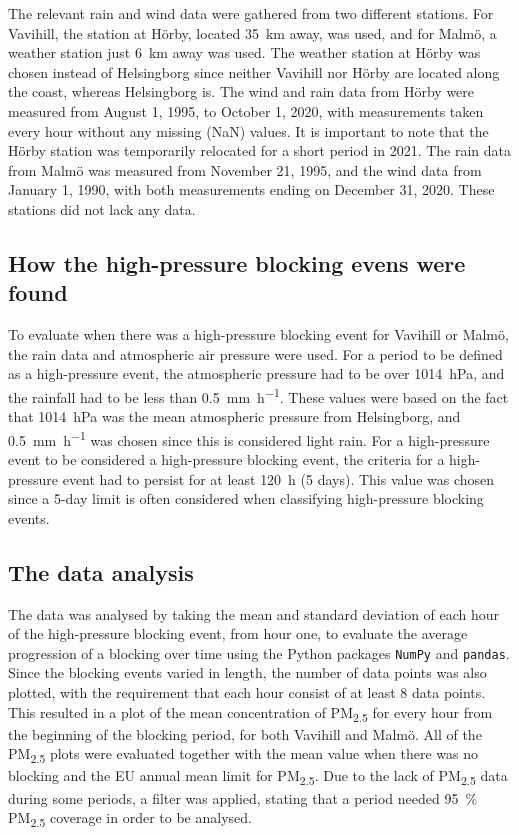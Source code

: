The relevant rain and wind data were gathered from two different stations. For Vavihill, the station at Hörby, located \SI{35}{\km} away, was used, and for Malmö, a weather station just \SI{6}{\km} away was used. The weather station at Hörby was chosen instead of Helsingborg since neither Vavihill nor Hörby are located along the coast, whereas Helsingborg is. The wind and rain data from Hörby were measured from August 1, 1995, to October 1, 2020, with measurements taken every hour without any missing (NaN) values. It is important to note that the Hörby station was temporarily relocated for a short period in 2021. The rain data from Malmö was measured from November 21, 1995, and the wind data from January 1, 1990, with both measurements ending on December 31, 2020. These stations did not lack any data.

\subsection{How the high-pressure blocking evens were found}
To evaluate when there was a high-pressure blocking event for Vavihill or Malmö, the rain data and atmospheric air pressure were used. For a period to be defined as a high-pressure event, the atmospheric pressure had to be over \SI{1014}{\hecto\pascal}, and the rainfall had to be less than \SI{0.5}{\mm\per\hour}. These values were based on the fact that \SI{1014}{\hecto\pascal} was the mean atmospheric pressure from Helsingborg, and \SI{0.5}{\mm\per\hour} was chosen since this is considered light rain. For a high-pressure event to be considered a high-pressure blocking event, the criteria for a high-pressure event had to persist for at least \SI{120}{\hour} (5 days). This value was chosen since a 5-day limit is often considered when classifying high-pressure blocking events. 

\subsection{The data analysis}
The data was analysed by taking the mean and standard deviation of each hour of the high-pressure blocking event, from hour one, to evaluate the average progression of a blocking over time using the Python packages \texttt{NumPy} and \texttt{pandas}. Since the blocking events varied in length, the number of data points was also plotted, with the requirement that each hour consist of at least 8 data points. This resulted in a plot of the mean concentration of PM\textsubscript{2.5} for every hour from the beginning of the blocking period, for both Vavihill and Malmö. All of the PM\textsubscript{2.5} plots were evaluated together with the mean value when there was no blocking and the EU annual mean limit for PM\textsubscript{2.5}. Due to the lack of PM\textsubscript{2.5} data during some periods, a filter was applied, stating that a period needed \SI{95}{\%} PM\textsubscript{2.5} coverage in order to be analysed.

